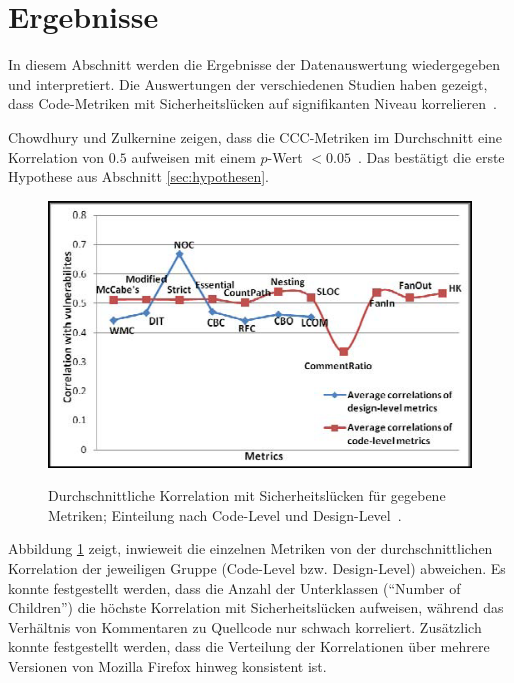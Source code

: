 \section{Ergebnisse}
\label{sec:ergebnisse}
In diesem Abschnitt werden die Ergebnisse der Datenauswertung wiedergegeben und interpretiert.
Die Auswertungen der verschiedenen Studien haben gezeigt, dass Code-Metriken mit Sicherheitslücken auf signifikanten Niveau korrelieren~\cite{chowdhury_zulkernine_2010,chowdhury_zulkernine_2009,alves_et_al}.

Chowdhury und Zulkernine zeigen, dass die CCC-Metriken im Durchschnitt eine Korrelation von $0.5$ aufweisen mit einem $p$-Wert $< 0.05$~\cite{chowdhury_zulkernine_2010}.
Das bestätigt die erste Hypothese aus Abschnitt \ref{sec:hypothesen}.
\begin{figure}
	\includegraphics[width=\textwidth]{img/code_vs_design.png}
	\label{fig:code_vs_design}
	\caption{Durchschnittliche Korrelation mit Sicherheitslücken für gegebene Metriken; Einteilung nach Code-Level und Design-Level~\cite{chowdhury_zulkernine_2010}.}
\end{figure}
Abbildung \ref{fig:code_vs_design} zeigt, inwieweit die einzelnen Metriken von der durchschnittlichen Korrelation der jeweiligen Gruppe (Code-Level bzw. Design-Level) abweichen.
Es konnte festgestellt werden, dass die Anzahl der Unterklassen ("`Number of Children"') die höchste Korrelation mit Sicherheitslücken aufweisen, während das Verhältnis von Kommentaren zu Quellcode nur schwach korreliert.
Zusätzlich konnte festgestellt werden, dass die Verteilung der Korrelationen über mehrere Versionen von Mozilla Firefox hinweg konsistent ist.

